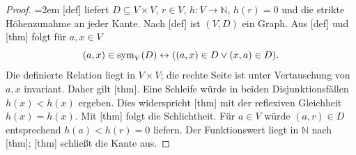 \begin{proof}
\emergencystretch=2em
[def] liefert
\(D\subseteq V\times V\), \(r\in V\), \(h\colon V\to\mathbb N\),
\(h(r)=0\) und die strikte Höhenzunahme an jeder Kante.
Nach [def] ist \((V,D)\) ein Graph.
Aus [def] und
[thm] folgt für
\(a,x\in V\)
\[
 (a,x)\in\operatorname{sym}_{V}(D)
 \leftrightarrow ((a,x)\in D\lor(x,a)\in D).
\]
Die definierte Relation liegt in \(V\times V\); die rechte Seite ist
unter Vertauschung von \(a,x\) invariant. Daher gilt
[thm]. Eine Schleife würde
in beiden Disjunktionsfällen \(h(x)<h(x)\) ergeben. Dies widerspricht
[thm] mit der reflexiven
Gleichheit \(h(x)=h(x)\). Mit
[thm] folgt die
Schlichtheit. Für \(a\in V\) würde \((a,r)\in D\) entsprechend
\(h(a)<h(r)=0\) liefern. Der Funktionswert liegt in \(\mathbb N\)
nach [thm];
[thm] schließt die Kante aus.
\end{proof}

